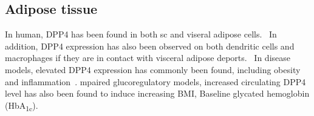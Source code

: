 \subsection{Adipose tissue}
In human, DPP4 has been found in both sc and viseral adipose cells.~\cite{Lamers2011} In addition, DPP4 expression has also been observed on both dendritic cells and macrophages if they are in contact with visceral adipose deports.~\cite{Zhong2013} In disease models, elevated DPP4 expression has commonly been found, including obesity and inflammation~\cite{Zhong2013}. mpaired glucoregulatory models, increased circulating DPP4 level has also been found to induce increasing BMI, Baseline glycated hemoglobin (HbA\textsubscript{1c}). 